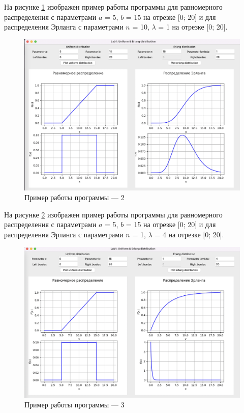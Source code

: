 \documentclass[12pt]{report}
\begin{document}
\clearpage
На рисунке \ref{fig:pic2} изображен пример работы программы для равномерного распределения с параметрами $a$ = 5, $b$ = 15 на отрезке [0; 20] и для распределения Эрланга с параметрами $n$ = 10, $\lambda$ = 1 на отрезке [0; 20].

\begin{figure}[h!btp]
	\centering
	\includegraphics[width=1\textwidth]{inc/pic2.png}
	\caption{Пример работы программы --- 2}
	\label{fig:pic2}	
\end{figure}
\clearpage

На рисунке \ref{fig:pic3} изображен пример работы программы для равномерного распределения с параметрами $a$ = 5, $b$ = 15 на отрезке [0; 20] и для распределения Эрланга с параметрами $n$ = 1, $\lambda$ = 4 на отрезке [0; 20].

\begin{figure}[h!btp]
	\centering
	\includegraphics[width=1\textwidth]{inc/pic3.png}
	\caption{Пример работы программы --- 3}
	\label{fig:pic3}	
\end{figure}

	
\end{document}
